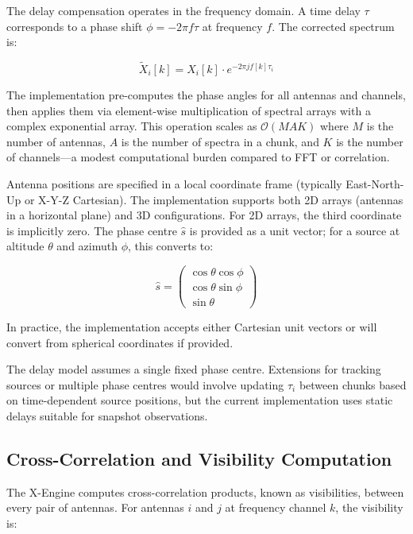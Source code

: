 The delay compensation operates in the frequency domain. A time delay $\tau$ corresponds to a phase shift $\phi = -2\pi f \tau$ at frequency $f$. The corrected spectrum is:

\begin{equation}
    \tilde{X}_i[k] = X_i[k] \cdot e^{-2\pi j f[k] \tau_i}
\end{equation}

The implementation pre-computes the phase angles for all antennas and channels, then applies them via element-wise multiplication of spectral arrays with a complex exponential array. This operation scales as $\mathcal{O}(MAK)$ where $M$ is the number of antennas, $A$ is the number of spectra in a chunk, and $K$ is the number of channels—a modest computational burden compared to FFT or correlation.

Antenna positions are specified in a local coordinate frame (typically East-North-Up or X-Y-Z Cartesian). The implementation supports both 2D arrays (antennas in a horizontal plane) and 3D configurations. For 2D arrays, the third coordinate is implicitly zero. The phase centre $\hat{s}$ is provided as a unit vector; for a source at altitude $\theta$ and azimuth $\phi$, this converts to:

\begin{equation}
    \hat{s} = \begin{pmatrix} \cos\theta \cos\phi \\ \cos\theta \sin\phi \\ \sin\theta \end{pmatrix}
\end{equation}

In practice, the implementation accepts either Cartesian unit vectors or will convert from spherical coordinates if provided.

The delay model assumes a single fixed phase centre. Extensions for tracking sources or multiple phase centres would involve updating $\tau_i$ between chunks based on time-dependent source positions, but the current implementation uses static delays suitable for snapshot observations.

\subsection{Cross-Correlation and Visibility Computation}

The X-Engine computes cross-correlation products, known as visibilities, between every pair of antennas. For antennas $i$ and $j$ at frequency channel $k$, the visibility is:

